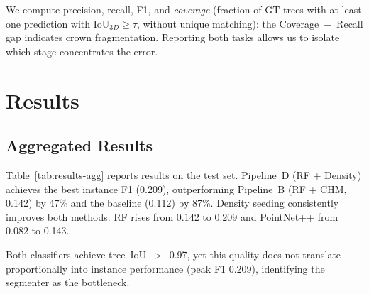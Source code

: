 \documentclass[runningheads]{llncs}
\begin{document}
We compute precision, recall, F1, and \emph{coverage} (fraction of GT trees with at least one prediction with IoU$_{3D} \geq \tau$, without unique matching): the Coverage~$-$~Recall gap indicates crown fragmentation. Reporting both tasks allows us to isolate which stage concentrates the error.

\section{Results}\label{sec:results}

\subsection{Aggregated Results}

Table~\ref{tab:results-agg} reports results on the test set. Pipeline~D (RF + Density) achieves the best instance F1 (0.209), outperforming Pipeline~B (RF + CHM, 0.142) by 47\% and the baseline (0.112) by 87\%. Density seeding consistently improves both methods: RF rises from 0.142 to 0.209 and PointNet++ from 0.082 to 0.143.

\begin{table}[H]
\centering
\caption{Aggregated results (test, IoU~3D~$\geq 0.5$, average over 11~plots).}\label{tab:results-agg}
\end{table}

Both classifiers achieve tree~IoU~$>$~0.97, yet this quality does not translate proportionally into instance performance (peak F1 0.209), identifying the segmenter as the bottleneck.
\end{document}
